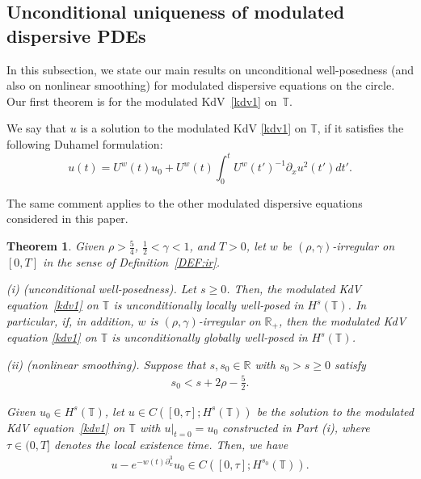 \documentclass[letterpaper, 11pt,  reqno]{amsart}
\newtheorem{theorem}{Theorem} [section]
\newcommand{\1}{\hspace{0.5mm}\text{I}\hspace{0.5mm}}
\newcommand{\noi}{\noindent}
\newcommand{\R}{\mathbb{R}}
\newcommand{\T}{\mathbb{T}}
\newcommand{\g}{\gamma}
\newcommand{\dx}{\partial_x}
\numberwithin{equation}{section}
\numberwithin{theorem}{section}
\begin{document}
\subsection{Unconditional uniqueness
of modulated dispersive PDEs}
\label{SUBSEC:UU}



In this subsection, 
we state our main results
on
unconditional well-posedness
(and also on nonlinear smoothing)
for modulated dispersive equations on the circle. 
Our first theorem is for the modulated KdV~\eqref{kdv1} on~$\T$.

We say that $u$
is a solution to the modulated KdV \eqref{kdv1} on $\T$, 
if it satisfies the following Duhamel formulation:
\begin{equation}
u(t) = U^w(t) u_0 +  U^w({t}) \int_0^t  U^w({t'})^{-1}\dx u^2(t')  dt'.
\label{mild1x}
\end{equation}


\noi
The same comment applies
to the other modulated dispersive equations considered in this paper.





\begin{theorem}\label{THM:UU1}
Given $\rho > \frac 54$,  $\frac12< \g < 1$, and $T> 0$, 
let  $w$ be $(\rho,\g)$-irregular on $[0, T]$ in the sense of Definition~\ref{DEF:ir}.


\smallskip

\noi
\textup{(i) (unconditional well-posedness).} 
Let   $s\ge 0$.
Then, the modulated KdV equation~\eqref{kdv1}
on  $\T$
is unconditionally locally well-posed in $H^s(\T)$.
In particular, 
if, in addition, $w$ is  $(\rho,\g)$-irregular  on $\R_+$, 
then the modulated KdV equation \eqref{kdv1}
on  $\T$
is unconditionally globally well-posed in $H^s(\T)$.

\smallskip

\noi
\textup{(ii) (nonlinear smoothing).} 
Suppose that %
$s, s_0 \in \R$ with 
$s_0 > s\ge 0$   satisfy
\begin{align*}
s_0 < s + 2\rho - \frac 52.
\end{align*}



\noi
Given $u_0 \in H^s(\T)$, 
let $u
\in C([0, \tau]; H^s(\T))$ be the  solution 
to the modulated KdV equation~\eqref{kdv1}
on $\T$
with $u|_{t = 0} = u_0$
constructed in Part (i), 
where 
$\tau \in (0,  T]$ denotes the local existence time.
Then, we have 
\begin{align*}
 u - e^{-w(t) \dx^3}u_0 \in C([0, \tau]; H^{s_0}(\T)).
\end{align*}



\end{theorem}
\end{document}
